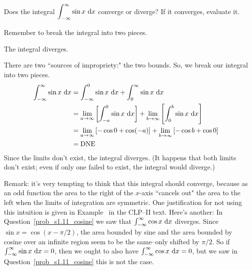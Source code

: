 \begin{Mquestion}\label{prob_s1.11_sine}
Does the integral $\displaystyle\int_{-\infty}^\infty \sin x~\mathrm{d}x$ converge or diverge?
 If it converges, evaluate it.
\end{Mquestion}
\begin{hint}
Remember to break the integral into two pieces.
\end{hint}
\begin{answer}
The integral diverges.
\end{answer}
\begin{solution}
There are two ``sources of impropriety:" the two bounds. So, we break our integral into two pieces.
\begin{align*}
\int_{-\infty}^\infty \sin x~\mathrm{d}x&=\int_{-\infty}^0 \sin x~\mathrm{d}x+\int_{0}^\infty \sin x~\mathrm{d}x\\
&=\lim_{a \to \infty }\left[\int_{-a}^0 \sin x~\mathrm{d}x\right]+
\lim_{b \to \infty }\left[\int_{0}^b \sin x~\mathrm{d}x\right]\\
&=\lim_{a \to \infty }\left[-\cos 0 + \cos(- a)
\right]+
\lim_{b \to \infty }\left[-\cos b + \cos 0
\right]\\
&=\text{DNE}
\end{align*}
Since the limits don't exist, the integral diverges. (It happens that both limits don't exist; even if only one failed to exist, the integral would diverge.)

Remark: it's very tempting to think that this integral should converge, because as an odd function the area to the right of the $x$-axis ``cancels out" the area to the left when the limits of integration are symmetric. One justification for not using this intuition is given in Example~ in the CLP--II text. Here's another:
In Question~\ref{prob_s1.11_cosine} we saw that $\int_{-\infty}^\infty \cos x~\mathrm{d}x$ diverges. Since $\sin x = \cos (x-\pi/2)$, the area bounded by sine and the area bounded by cosine over an infinite region seem to be the same--only shifted by $\pi/2$. So if $\int_{-\infty}^\infty \sin x~\mathrm{d}x=0$, then we ought to also have $\int_{-\infty}^\infty \cos x~\mathrm{d}x=0$, but we saw in Question~\ref{prob_s1.11_cosine} this is not the case.

\begin{center}
\end{center}
\end{solution}


